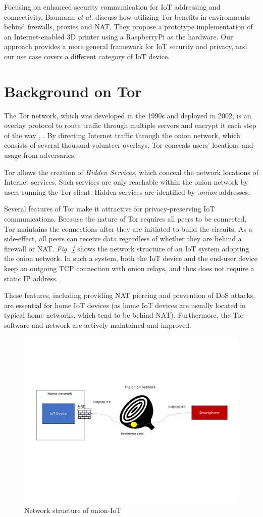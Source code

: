 Focusing on enhanced security communication for IoT addressing and connectivity, Baumann \textit{et al.} \cite{baumann2018utilising} discuss how utilizing Tor benefits in environments behind firewalls, proxies and NAT. They propose a prototype implementation of an Internet-enabled 3D printer using a RaspberryPi as the hardware. Our approach provides a more general framework for IoT security and privacy, and our use case covers a different category of IoT device.

\section{Background on Tor}
\label{sec:torbackground}
The Tor network, which was developed in the 1990s and deployed in 2002, is an overlay protocol to route traffic through multiple servers and encrypt it each step of the way \cite{torproject}, \cite{chaabane2010digging}. By directing Internet traffic through the onion network, which consists of several thousand volunteer overlays, Tor conceals users' locations and usage from adversaries.

Tor allows the creation of \textit{Hidden Services}, which conceal the network locations of Internet services. Such services are only reachable within the onion network by users running the Tor client. Hidden services are identified by \textit{.onion} addresses.

Several features of Tor make it attractive for privacy-preserving IoT communications. Because the nature of Tor requires all peers to be connected, Tor maintains the connections after they are initiated to build the circuits. As a side-effect, all peers can receive data regardless of whether they are behind a firewall or NAT. \textit{Fig. \ref{fig:natpiercing}} shows the network structure of an IoT system adopting the onion network. In such a system, both the IoT device and the end-user device keep an outgoing TCP connection with onion relays, and thus does not require a static IP address.

These features, including providing NAT piercing and prevention of DoS attacks, are essential for home IoT devices (as home IoT devices are usually located in typical home networks, which tend to be behind NAT). Furthermore, the Tor software and network are actively maintained and improved.

\begin{figure}
	\includegraphics[width=\linewidth]{natpiercing.pdf}
	\caption{Network structure of onion-IoT}
	\label{fig:natpiercing}
\end{figure}